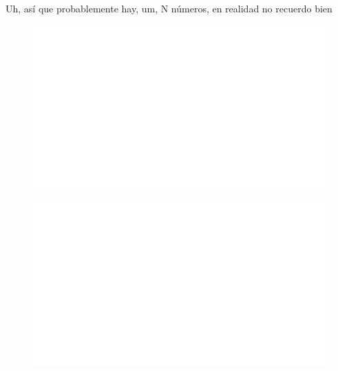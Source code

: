 Uh, así que probablemente hay, um, N números, en realidad no recuerdo bien

\begin{centering}
    \begin{figure}[h]
        \centering
        \includegraphics[width=\textwidth]{whyareyoucheckingthenameofthisfile.png}
    \end{figure}
\end{centering}

\begin{centering}
    \begin{figure}[h!]
        \centering
        \includegraphics[width=\textwidth]{whyareyoucheckingthenameofthisfile.png}
    \end{figure}
\end{centering}

